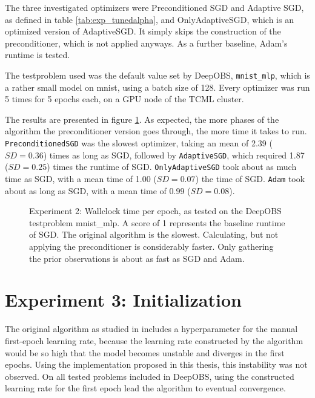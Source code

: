\documentclass[twoside,12pt,a4paper]{report}
\begin{document}
The three investigated optimizers were Preconditioned SGD and Adaptive SGD, as defined in table \ref{tab:exp_tunedalpha}, and OnlyAdaptiveSGD, which is an optimized version of AdaptiveSGD. It simply skips the construction of the preconditioner, which is not applied anyways.
As a further baseline, Adam's runtime is tested.

The testproblem used was the default value set by DeepOBS, \verb|mnist_mlp|, which is a rather small model on mnist, using a batch size of 128. Every optimizer was run 5 times for 5 epochs each, on a GPU node of the TCML cluster.

The results are presented in figure \ref{fig:exp_perf_prec}. As expected, the more phases of the algorithm the preconditioner version goes through, the more time it takes to run.
\verb|PreconditionedSGD| was the slowest optimizer, taking an mean of 2.39 ($SD = 0.36$) times as long as SGD, followed by \verb|AdaptiveSGD|, which required 1.87 ($SD = 0.25$) times the runtime of SGD. \verb|OnlyAdaptiveSGD| took about as much time as SGD, with a mean time of 1.00 ($SD = 0.07$) the time of SGD. \verb|Adam| took about as long as SGD, with a mean time of 0.99 ($SD = 0.08$).

\begin{figure}
	\centering \hspace{-1,5cm}
	
	\caption{Experiment 2: Wallclock time per epoch, as tested on the DeepOBS testproblem mnist\_mlp. A score of 1 represents the baseline runtime of SGD. The original algorithm is the slowest. Calculating, but not applying the preconditioner is considerably faster. Only gathering the prior observations is about as fast as SGD and Adam.}
	\label{fig:exp_perf_prec}
	
\end{figure}


\section{Experiment 3: Initialization}
The original algorithm as studied in \cite{roos2019active} includes a hyperparameter for the manual first-epoch learning rate, because the learning rate constructed by the algorithm would be so high that the model becomes unstable and diverges in the first epochs.
Using the implementation proposed in this thesis, this instability was not observed. On all tested problems included in DeepOBS, using the constructed learning rate for the first epoch lead the algorithm to eventual convergence.
\end{document}

